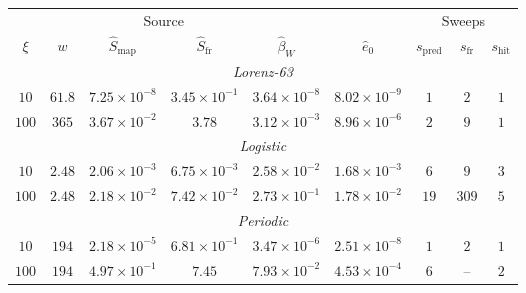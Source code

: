 \setlength{\tabcolsep}{1.5pt}\renewcommand{\arraystretch}{1.15}
\begin{tabular*}{\textwidth}{@{\extracolsep{\fill}}ccccccccc@{}}\toprule
& & \multicolumn{2}{c}{Source} & & & \multicolumn{3}{c}{Sweeps}\\\cmidrule(lr){3-4}\cmidrule(lr){7-9}
$\xi$ & $w$ & $\hat S_{\mathrm{map}}$ & $\hat S_{\mathrm{fr}}$ & $\hat\beta_W$ & $\hat e_0$ & $s_{\mathrm{pred}}$ & $s_{\mathrm{fr}}$ & $s_{\mathrm{hit}}$\\
\midrule
\multicolumn{9}{c}{\textit{Lorenz-63}}\\*
$10$ & $61.8$ & $7.25\times 10^{-8}$ & $3.45\times 10^{-1}$ & $3.64\times 10^{-8}$ & $8.02\times 10^{-9}$ & $1$ & $2$ & $1$\\*
$100$ & $365$ & $3.67\times 10^{-2}$ & $3.78$ & $3.12\times 10^{-3}$ & $8.96\times 10^{-6}$ & $2$ & $9$ & $1$\\
\midrule
\multicolumn{9}{c}{\textit{Logistic}}\\*
$10$ & $2.48$ & $2.06\times 10^{-3}$ & $6.75\times 10^{-3}$ & $2.58\times 10^{-2}$ & $1.68\times 10^{-3}$ & $6$ & $9$ & $3$\\*
$100$ & $2.48$ & $2.18\times 10^{-2}$ & $7.42\times 10^{-2}$ & $2.73\times 10^{-1}$ & $1.78\times 10^{-2}$ & $19$ & $309$ & $5$\\
\midrule
\multicolumn{9}{c}{\textit{Periodic}}\\*
$10$ & $194$ & $2.18\times 10^{-5}$ & $6.81\times 10^{-1}$ & $3.47\times 10^{-6}$ & $2.51\times 10^{-8}$ & $1$ & $2$ & $1$\\*
$100$ & $194$ & $4.97\times 10^{-1}$ & $7.45$ & $7.93\times 10^{-2}$ & $4.53\times 10^{-4}$ & $6$ & -- & $2$\\
\bottomrule\end{tabular*}
